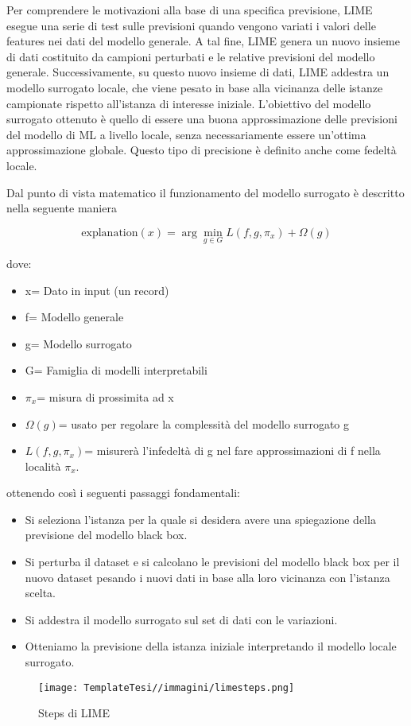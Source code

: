 \begin{flushleft}
Per comprendere le motivazioni alla base di una specifica previsione, LIME esegue una serie di test sulle previsioni quando vengono variati i valori delle features nei dati del modello generale. A tal fine, LIME genera un nuovo insieme di dati costituito da campioni perturbati e le relative previsioni del modello generale. Successivamente, su questo nuovo insieme di dati, LIME addestra un modello surrogato locale, che viene pesato in base alla vicinanza delle istanze campionate rispetto all'istanza di interesse iniziale. L'obiettivo del modello surrogato ottenuto è quello di essere una buona approssimazione delle previsioni del modello di ML a livello locale, senza necessariamente essere un'ottima approssimazione globale. Questo tipo di precisione è definito anche come fedeltà locale.\cite{interpretableml}

Dal punto di vista matematico il funzionamento del modello surrogato è descritto nella seguente maniera 

$$\text{explanation}(x)=\arg\min_{g\in{}G}L(f,g,\pi_x)+\Omega(g)$$

dove:
\begin{itemize}
   \item x= Dato in input (un record)
    \item f= Modello generale
    \item g= Modello surrogato
    \item G= Famiglia di modelli interpretabili
    \item \(\pi_x\)= misura di prossimita ad x
    \item \(\Omega(g)\)= usato per regolare la complessità del modello surrogato g
    \item \(L(f,g,\pi_x)\)= misurerà l'infedeltà di g nel fare approssimazioni di f nella località $\pi_x$.
\end{itemize}
ottenendo così i seguenti passaggi fondamentali:
\begin{itemize}
    \item Si seleziona l'istanza per la quale si desidera avere una spiegazione della previsione del modello black box.
    \item Si perturba il dataset e si calcolano le previsioni del modello black box per il nuovo dataset pesando i nuovi dati in base alla loro vicinanza con l'istanza scelta.
    \item Si addestra il modello surrogato sul set di dati con le variazioni.
    \item Otteniamo la previsione della istanza iniziale interpretando il modello locale surrogato.
\end{itemize}
\begin{figure}[H]
    \centering
    \texttt{[image: TemplateTesi//immagini/limesteps.png]}
    \caption{Steps di LIME \cite{immstepslime}}
    \label{fig:enter-label}
\end{figure}

\end{flushleft}
